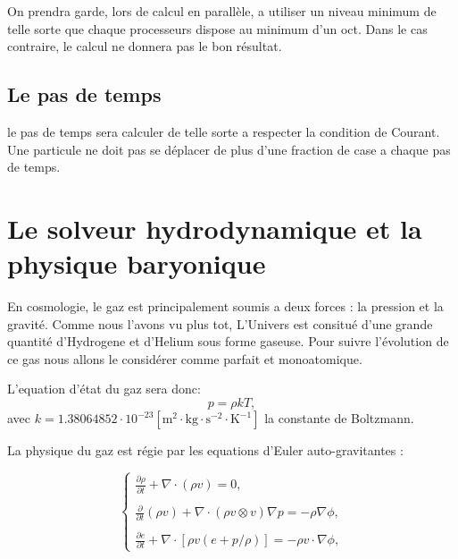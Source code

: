 On prendra garde, lors de calcul en parallèle, a utiliser un niveau minimum de telle sorte que chaque processeurs dispose au minimum d'un oct.
Dans le cas contraire, le calcul ne donnera pas le bon résultat.

\subsection{Le pas de temps}

le pas de temps sera calculer de telle sorte a respecter la condition de Courant.
Une particule ne doit pas se déplacer de plus d'une fraction de case a chaque pas de temps.


\section{Le solveur hydrodynamique et la physique baryonique}



En cosmologie, le gaz est principalement soumis a deux forces : la pression et la gravité.
Comme nous l'avons vu plus tot, L'Univers est consitué d'une grande quantité d'Hydrogene et d'Helium sous forme gaseuse.
Pour suivre l'évolution de ce gas nous allons le considérer comme parfait et monoatomique.

L'equation d'état du gaz sera donc:
\begin{equation}
p=\rho k T, 
\end{equation}
avec $k=1.38064852 \cdot 10^{-23} \left[ \mathrm{m^2 \cdot kg \cdot s^{-2} \cdot K^{-1}} \right] $ la constante de Boltzmann.

La physique du gaz est régie par les equations d'Euler auto-gravitantes :

\begin{equation}
\begin{cases}

{ \frac{ \partial \rho }{ \partial t } + \nabla \cdot (\rho v) = 0}, \\
\\
{ \frac{ \partial }{ \partial t } (\rho v) + \nabla \cdot (\rho v \otimes v ) \nabla p = -\rho\nabla \phi }, \\
\\
{ \frac{ \partial e }{ \partial t } + \nabla \cdot [ \rho v (e+p/\rho) ] = -\rho v \cdot \nabla \phi },

\end{cases}
\end{equation}
\label{eq:hydro}

